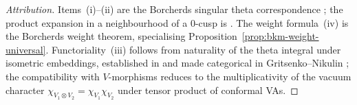 \begin{proof}[Attribution]
Items~\textup{(i)--(ii)} are the Borcherds singular theta correspondence \cite[Thms.~13.3, 14.3]{Borcherds1998}; the product expansion in a neighbourhood of a $0$-cusp is \cite[Thm.~13.3~(5)]{Borcherds1998}. The weight formula~\textup{(iv)} is the Borcherds weight theorem, specialising Proposition~\ref{prop:bkm-weight-universal}. Functoriality~\textup{(iii)} follows from naturality of the theta integral under isometric embeddings, established in \cite[§14]{Borcherds1998} and made categorical in Gritsenko--Nikulin \cite{GN1996, GN2002}; the compatibility with $V$-morphisms reduces to the multiplicativity of the vacuum character $\chi_{V_1 \otimes V_2} = \chi_{V_1} \chi_{V_2}$ under tensor product of conformal VAs.
\end{proof}


